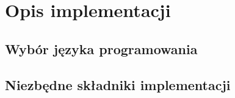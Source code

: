 \section{Opis implementacji}

\subsection*{Wybór języka programowania}


\subsection*{Niezbędne składniki implementacji}

